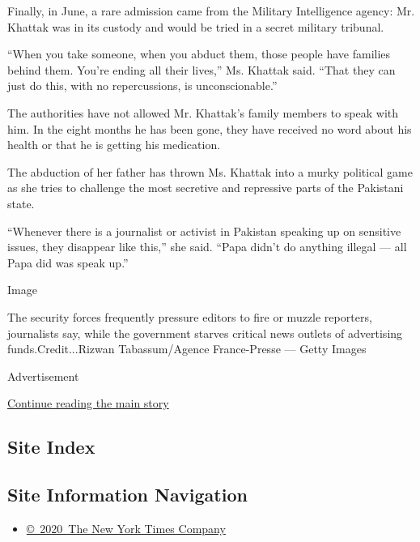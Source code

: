 Finally, in June, a rare admission came from the Military Intelligence
agency: Mr. Khattak was in its custody and would be tried in a secret
military tribunal.

``When you take someone, when you abduct them, those people have
families behind them. You're ending all their lives,'' Ms. Khattak said.
``That they can just do this, with no repercussions, is
unconscionable.''

The authorities have not allowed Mr. Khattak's family members to speak
with him. In the eight months he has been gone, they have received no
word about his health or that he is getting his medication.

The abduction of her father has thrown Ms. Khattak into a murky
political game as she tries to challenge the most secretive and
repressive parts of the Pakistani state.

``Whenever there is a journalist or activist in Pakistan speaking up on
sensitive issues, they disappear like this,'' she said. ``Papa didn't do
anything illegal --- all Papa did was speak up.''

Image

The security forces frequently pressure editors to fire or muzzle
reporters, journalists say, while the government starves critical news
outlets of advertising funds.Credit...Rizwan Tabassum/Agence
France-Presse --- Getty Images

Advertisement

\protect\hyperlink{after-bottom}{Continue reading the main story}

\hypertarget{site-index}{%
\subsection{Site Index}\label{site-index}}

\hypertarget{site-information-navigation}{%
\subsection{Site Information
Navigation}\label{site-information-navigation}}

\begin{itemize}
\tightlist
\item
  \href{https://help.nytimes3xbfgragh.onion/hc/en-us/articles/115014792127-Copyright-notice}{©~2020~The
  New York Times Company}
\end{itemize}

